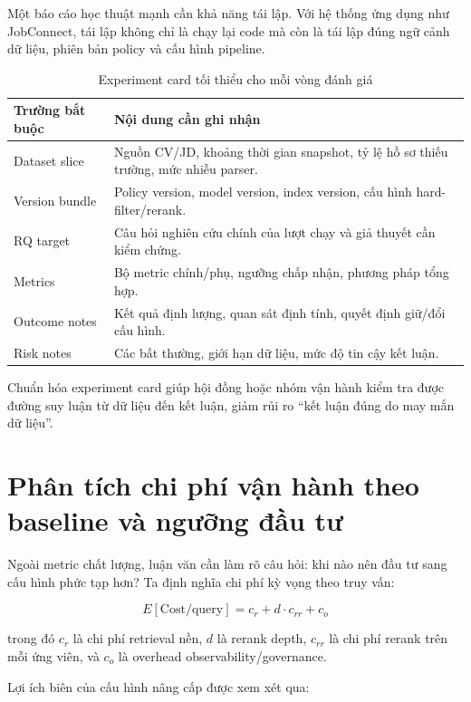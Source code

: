 Một báo cáo học thuật mạnh cần khả năng tái lập. Với hệ thống ứng dụng như JobConnect, tái lập không chỉ là chạy lại code mà còn là tái lập đúng ngữ cảnh dữ liệu, phiên bản policy và cấu hình pipeline.

\begin{table}[H]
\caption{Experiment card tối thiểu cho mỗi vòng đánh giá}
\centering
\begin{tabularx}{\textwidth}{p{}X}
\toprule
\textbf{Trường bắt buộc} & \textbf{Nội dung cần ghi nhận}\\
\midrule
Dataset slice & Nguồn CV/JD, khoảng thời gian snapshot, tỷ lệ hồ sơ thiếu trường, mức nhiễu parser.\\
Version bundle & Policy version, model version, index version, cấu hình hard-filter/rerank.\\
RQ target & Câu hỏi nghiên cứu chính của lượt chạy và giả thuyết cần kiểm chứng.\\
Metrics & Bộ metric chính/phụ, ngưỡng chấp nhận, phương pháp tổng hợp.\\
Outcome notes & Kết quả định lượng, quan sát định tính, quyết định giữ/đổi cấu hình.\\
Risk notes & Các bất thường, giới hạn dữ liệu, mức độ tin cậy kết luận.\\
\bottomrule
\end{tabularx}
\end{table}

Chuẩn hóa experiment card giúp hội đồng hoặc nhóm vận hành kiểm tra được đường suy luận từ dữ liệu đến kết luận, giảm rủi ro ``kết luận đúng do may mắn dữ liệu''.

\section{Phân tích chi phí vận hành theo baseline và ngưỡng đầu tư}

Ngoài metric chất lượng, luận văn cần làm rõ câu hỏi: khi nào nên đầu tư sang cấu hình phức tạp hơn? Ta định nghĩa chi phí kỳ vọng theo truy vấn:

\begin{equation}
E[\text{Cost/query}] = c_r + d \cdot c_{rr} + c_o
\end{equation}

trong đó $c_r$ là chi phí retrieval nền, $d$ là rerank depth, $c_{rr}$ là chi phí rerank trên mỗi ứng viên, và $c_o$ là overhead observability/governance.

Lợi ích biên của cấu hình nâng cấp được xem xét qua:

